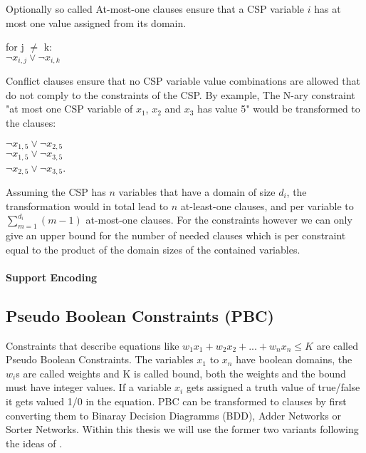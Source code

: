 Optionally so called At-most-one clauses ensure that a CSP variable $i$ has at most one value assigned from its domain.
\begin{center}
    for j $\neq$ k:\\
    $\neg x_{i,j} \lor \neg x_{i,k}$
\end{center}

Conflict clauses ensure that no CSP variable value combinations are allowed that do not comply to the constraints of the CSP.
By example, The N-ary constraint "at most one CSP variable of $x_1$, $x_2$ and $x_3$ has value 5" would be transformed to the clauses:
\begin{center}
 $\neg x_{1,5} \lor \neg x_{2,5}$\\
 $\neg x_{1,5} \lor \neg x_{3,5}$\\
 $\neg x_{2,5} \lor \neg x_{3,5}$. 
\end{center}

Assuming the CSP has $n$ variables that have a domain of size $d_i$, the transformation would in total lead to $n$ at-least-one clauses, and per variable to $\sum_{m=1}^{d_i} (m-1)$ at-most-one clauses. For the constraints however we can only give an upper bound for the number of needed clauses which is per constraint equal to the product of the domain sizes of the contained variables.

\paragraph{Support Encoding \cite{kasif1990OnTheParallelComplexityOfDiscreteRelaxationInConstraintSatisfactionNetworks}\cite{gent20002ArcConsistencyInSAT}}

\subsection{Pseudo Boolean Constraints (PBC)}
Constraints that describe equations like $w_1x_1+w_2x_2+...+w_nx_n \leq K$ are called Pseudo Boolean Constraints. The variables $x_1$ to $x_n$ have boolean domains, the $w_i$s are called weights and K is called bound, both the weights and the bound must have integer values. If a variable $x_i$ gets assigned a truth value of true/false it gets valued 1/0 in the equation. PBC can be transformed to clauses by first converting them to Binaray Decision Diagramms (BDD), Adder Networks or Sorter Networks. Within this thesis we will use the former two variants following the ideas of \cite{En2006TranslatingPC}.

